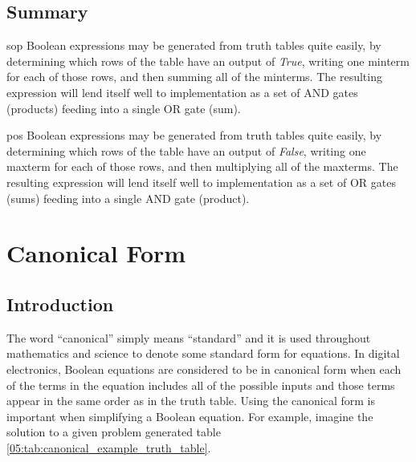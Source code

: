 \subsection{Summary}
\label{05:subsubsec:summary_minterms_and_maxterms}

\gls{sop} Boolean expressions may be generated from truth tables quite easily, by determining which rows of the table have an output of \emph{True}, writing one minterm for each of those rows, and then summing all of the minterms. The resulting expression will lend itself well to implementation as a set of \textsf{AND} gates (products) feeding into a single \textsf{OR} gate (sum). 

\gls{pos} Boolean expressions may be generated from truth tables quite easily, by determining which rows of the table have an output of \emph{False}, writing one maxterm for each of those rows, and then multiplying all of the maxterms. The resulting expression will lend itself well to implementation as a set of \textsf{OR} gates (sums) feeding into a single \textsf{AND} gate (product). 

\section{Canonical Form}
\label{05:sec:canonical_form}

\subsection{Introduction}
\label{05:subsec:introduction_to_canonical_form}

The word ``canonical'' simply means ``standard'' and it is used throughout mathematics and science to denote some standard form for equations. In digital electronics, Boolean equations are considered to be in canonical form when each of the terms in the equation includes all of the possible inputs and those terms appear in the same order as in the truth table. Using the canonical form is important when simplifying a Boolean equation. For example, imagine the solution to a given problem generated table \ref{05:tab:canonical_example_truth_table}.

